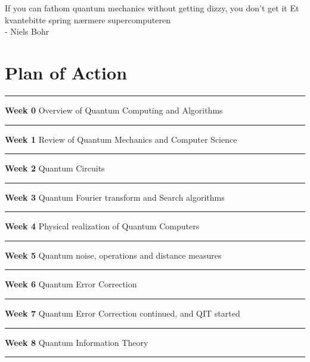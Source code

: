 \documentclass{package/notes}
\begin{document}
\begin{titlepage}
{\large If you can fathom quantum mechanics without getting dizzy, you don't get it
Et kvantebitte spring nærmere supercomputeren\\ - Niels Bohr}
\end{titlepage}

\newpage


\tableofcontents

\chapter{Plan of Action}
\hrule
\vspace{5mm}
\begin{gitemize}
\item \Large{\textbf{Week 0}}
\qquad
Overview of Quantum Computing and Algorithms
\vspace{5mm}
\hrule
\vspace{5mm}
\item \Large{\textbf{Week 1}}
\qquad
Review of Quantum Mechanics and Computer Science
\vspace{5mm}
\hrule
\vspace{5mm}
\item \Large{\textbf{Week 2}}
\qquad
Quantum Circuits
\vspace{5mm}
\hrule
\vspace{5mm}
\item \Large{\textbf{Week 3}}
\qquad
Quantum Fourier transform and Search algorithms
\vspace{5mm}
\hrule
\vspace{5mm}
\item \Large{\textbf{Week 4}}
\qquad
Physical realization of Quantum Computers
\vspace{5mm}
\hrule
\vspace{5mm}
\item \Large{\textbf{Week 5}}
\qquad
Quantum noise, operations and distance measures
\vspace{5mm}
\hrule
\vspace{5mm}
\item \Large{\textbf{Week 6}}
\qquad
Quantum Error Correction
\vspace{5mm}
\hrule
\vspace{5mm}
\item \Large{\textbf{Week 7}}
\qquad
Quantum Error Correction continued, and QIT started
\vspace{5mm}
\hrule
\vspace{5mm}
\item \Large{\textbf{Week 8}}
\qquad
Quantum Information Theory
\vspace{5mm}
\hrule
\end{gitemize}
\end{document}
